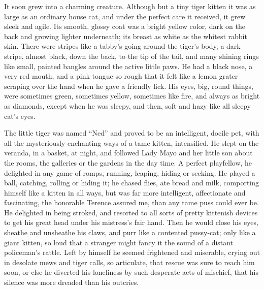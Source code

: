 \documentclass[12pt]{book}
\begin{document}
It soon grew into a charming creature. Although but a tiny tiger kitten it was
as large as an ordinary house cat, and under the perfect care it received, it grew
sleek and agile. Its smooth, glossy coat was a bright yellow color, dark on the
back and growing lighter underneath; its breast as white as the whitest rabbit
skin. There were stripes like a tabby’s going around the tiger’s body, a dark stripe,
almost black, down the back, to the tip of the tail, and many shining rings like
small, painted bangles around the active little paws. He had a black nose, a very
red mouth, and a pink tongue so rough that it felt like a lemon grater scraping
over the hand when he gave a friendly lick. His eyes, big, round things, were
sometimes green, sometimes yellow, sometimes like fire, and always as bright as
diamonds, except when he was sleepy, and then, soft and hazy like all sleepy cat’s
eyes.

The little tiger was named “Ned” and proved to be an intelligent, docile pet,
with all the mysteriously enchanting ways of a tame kitten, intensified. He slept
on the veranda, in a basket, at night, and followed Lady Mayo and her little son
about the rooms, the galleries or the gardens in the day time. A perfect playfellow,
he delighted in any game of romps, running, leaping, hiding or seeking. He played
a ball, catching, rolling or hiding it; he chased flies, ate bread and milk, comporting
himself like a kitten in all ways, but was far more intelligent, affectionate and
fascinating, the honorable Terence assured me, than any tame puss could ever be.
He delighted in being stroked, and resorted to all sorts of pretty kittenish devices
to get his great head under his mistress’s fair hand. Then he would close his
eyes, sheathe and unsheathe his claws, and purr like a contented pussy‐cat; only
like a giant kitten, so loud that a stranger might fancy it the sound of a distant
policeman’s rattle. Left by himself he seemed frightened and miserable, crying
out in desolate mews and tiger calls, so articulate, that rescue was sure to reach
him soon, or else he diverted his loneliness by such desperate acts of mischief,
that his silence was more dreaded than his outcries.
\end{document}
